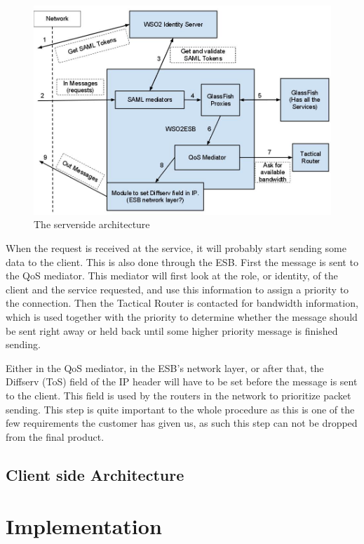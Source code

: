 \documentclass[12pt]{article}
\begin{document}
        \begin{figure}
            \includegraphics[scale=0.5]{serverside}
            \caption{The serverside architecture}
            \label{fig:serverside}
        \end{figure}

        When the request is received at the service, it will probably start sending some data to the client. This is also done through the ESB. First the message is sent to the QoS mediator. This mediator will first look at the role, or identity, of the client and the service requested, and use this information to assign a priority to the connection. Then the Tactical Router is contacted for bandwidth information, which is used together with the priority to determine whether the message should be sent right away or held back until some higher priority message is finished sending.

        Either in the QoS mediator, in the ESB’s network layer, or after that, the Diffserv (ToS) field of the IP header will have to be set before the message is sent to the client. This field is used by the routers in the network to prioritize packet sending. This step is quite important to the whole procedure as this is one of the few requirements the customer has given us, as such this step can not be dropped from the final product.
        
    \subsection{Client side Architecture}\label{clientsidearch}        
        
\section{Implementation}\label{implementation}
\end{document}
